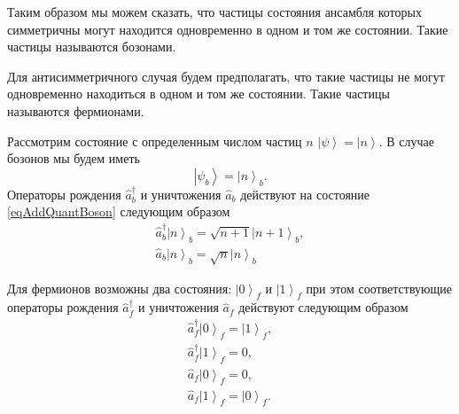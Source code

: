Таким образом мы можем сказать, что частицы
состояния ансамбля которых симметричны могут находится одновременно в
одном и том же состоянии. Такие частицы называются бозонами.

Для антисимметричного случая будем  
предполагать, что такие частицы не могут одновременно находиться в
одном и том же состоянии. Такие частицы называются фермионами.

Рассмотрим состояние с определенным числом частиц $n$
$\left|\psi\right> = \left|n\right>$. В случае бозонов 
мы будем иметь 
\begin{equation}
\left|\psi_b\right> = \left|n\right>_b.
\label{eqAddQuantBoson}
\end{equation}
Операторы рождения $\hat{a}_b^{\dag}$ и уничтожения $\hat{a}_b$ действуют на
состояние \eqref{eqAddQuantBoson} следующим образом
\begin{eqnarray}
\hat{a}_b^{\dag}\left|n\right>_b = \sqrt{n+1}\left|n+1\right>_b, 
\nonumber \\
\hat{a}_b\left|n\right>_b = \sqrt{n}\left|n\right>_b
\nonumber
\end{eqnarray}

Для фермионов  возможны два состояния: $\left|0\right>_f$ и
$\left|1\right>_f$ при этом соответствующие операторы рождения
$\hat{a}_f^{\dag}$ и уничтожения $\hat{a}_f$ действуют следующим образом
\begin{eqnarray}
\hat{a}_f^{\dag}\left|0\right>_f = \left|1\right>_f, 
\nonumber \\
\hat{a}_f^{\dag}\left|1\right>_f = 0, 
\nonumber \\
\hat{a}_f\left|0\right>_f = 0, 
\nonumber \\
\hat{a}_f\left|1\right>_f = \left|0\right>_f.
\nonumber
\end{eqnarray}
